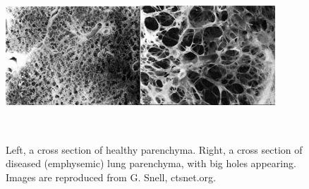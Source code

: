 \begin{figure}[H]
  \centering
{\includegraphics[width=0.9\textwidth,height=2.2in]{figures/images/emphysema.jpg}}                
\caption{ Left, a cross section of healthy parenchyma. Right, a cross section of diseased (emphysemic) lung parenchyma, with big holes appearing. Images are reproduced from G. Snell, ctsnet.org.
 }
 \label{fig:emphysemic}
\end{figure}












